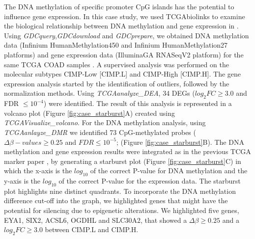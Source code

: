 The DNA methylation of specific promoter CpG islands has the potential to influence gene expression. In this case study, we used TCGAbiolinks to examine the biological relationship between DNA methylation and gene expression in . Using \textit{GDCquery},\textit{GDCdownload} and \textit{GDCprepare}, we obtained DNA methylation data (Infinium HumanMethylation450 and Infinium HumanMethylation27 platforms) and gene expression data (IlluminaGA RNASeqV2 platform) for the same TCGA COAD samples \cite{cancer2012comprehensive}. A supervised analysis was performed on the molecular subtypes CIMP-Low [CIMP.L] and CIMP-High [CIMP.H].
The gene expression analysis started by the identification of outliers, followed by the normalization methods. Using \textit{TCGAanalyze\_DEA}, 34 DEGs ($log_2FC\geq 3.0$ and FDR $\leq 10^{-4}$) were identified. The result of this analysis is represented in a volcano plot (Figure \ref{fig:case_starburst}A) created using \textit{TCGAVisualize\_volcano}. 
For the DNA methylation analysis,
using \textit{TCGAanlayze\_DMR} we identified 73 CpG-methylated probes ($\Delta\beta-values\geq 0.25$ and  $FDR \leq 10^{-5}$;  (Figure \ref{fig:case_starburst}B). The DNA methylation and gene expression results were integrated as in the previous TCGA marker paper \cite{noushmehr2010identification,cancer2012comprehensive}, by generating a starburst plot (Figure \ref{fig:case_starburst}C) in which the x-axis is the $log_{10}$ of the correct P-value for DNA methylation and the y-axis is the $log_{10}$ of the correct P-value for the expression data. The starburst plot highlights nine distinct quadrants. To incorporate the DNA methylation difference cut-off into the  graph, we highlighted genes that might have the potential for silencing due to epigenetic alterations. We highlighted five genes, EYA1, SIX2, ACSL6, OGDHL and SLC30A2, that showed a $\Delta\beta\geq0.25$ and a $log_2FC\geq 3.0$ between CIMP.L and CIMP.H.



